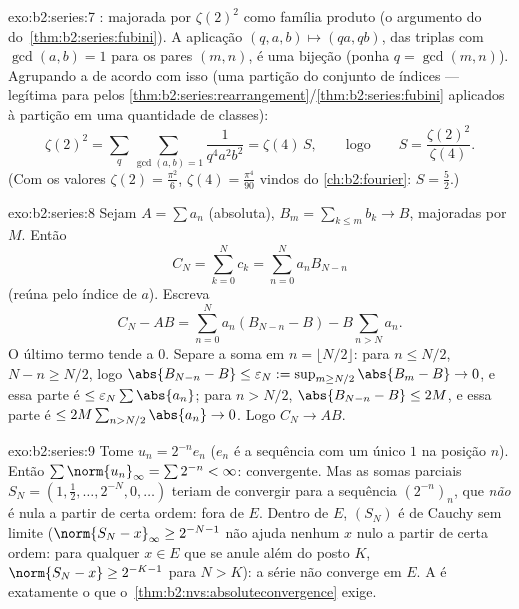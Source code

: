 \begin{solution}{exo:b2:series:7}
: majorada por $\zeta(2)^2$ como família produto
(o argumento do  do~\cref{thm:b2:series:fubini}). A aplicação
$(q, a, b) \mapsto (qa, qb)$, das triplas com $\gcd(a, b) = 1$
para os pares $(m, n)$, é uma bijeção (ponha $q = \gcd(m,n)$). Agrupando
a  de acordo com isso (uma partição do conjunto de índices ---
legítima para  pelos
\cref{thm:b2:series:rearrangement}/\cref{thm:b2:series:fubini}
aplicados à partição em uma quantidade  de classes):
\[
\zeta(2)^2 = \sum_{q} \sum_{\gcd(a,b)=1} \frac{1}{q^4 a^2 b^2}
= \zeta(4)\, S,
\qquad\text{logo}\qquad
S = \frac{\zeta(2)^2}{\zeta(4)} .
\]
(Com os valores $\zeta(2) = \frac{\pi^2}{6}$,
$\zeta(4) = \frac{\pi^4}{90}$ vindos do
\cref{ch:b2:fourier}: $S = \frac{5}{2}$.)
\end{solution}

\begin{solution}{exo:b2:series:8}
Sejam $A = \sum a_n$ (absoluta), $B_m = \sum_{k\leq m} b_k \to B$,
majoradas por $M$. Então
\[
C_N = \sum_{k=0}^{N} c_k = \sum_{n=0}^{N} a_n B_{N-n}
\]
(reúna pelo índice de $a$). Escreva
\[
C_N - AB = \sum_{n=0}^{N} a_n (B_{N-n} - B) - B\sum_{n > N} a_n .
\]
O último termo tende a $0$. Separe a soma em $n = \lfloor N/2
\rfloor$: para $n \leq N/2$, $N - n \geq N/2$, logo $\abs{B_{N-n} - B}
\leq \varepsilon_N := \sup_{m \geq N/2}\abs{B_m - B} \to 0$, e
essa parte é $\leq \varepsilon_N \sum\abs{a_n}$; para $n > N/2$,
$\abs{B_{N-n} - B} \leq 2M$, e essa parte é $\leq 2M \sum_{n >
N/2} \abs{a_n} \to 0$. Logo $C_N \to AB$.
\end{solution}

\begin{solution}{exo:b2:series:9}
Tome $u_n = 2^{-n} e_n$ ($e_n$ é a sequência com um único $1$ na
posição $n$). Então $\sum \norm{u_n}_\infty = \sum 2^{-n} <
\infty$:  convergente. Mas as somas parciais $S_N =
(1, \tfrac12, \dots, 2^{-N}, 0, \dots)$ teriam de convergir para
a sequência $(2^{-n})_n$, que \emph{não} é nula a partir de certa ordem:
fora de $E$. Dentro de $E$, $(S_N)$ é de Cauchy sem limite ($\norm{S_N
- x}_\infty \geq 2^{-N-1}$ não ajuda nenhum $x$ nulo a partir de certa ordem:
para qualquer $x \in E$ que se anule além do posto $K$, $\norm{S_N - x} \geq
2^{-K-1}$ para $N > K$): a série não converge em $E$.
A  é exatamente o que o~\cref{thm:b2:nvs:absoluteconvergence}
exige.
\end{solution}

